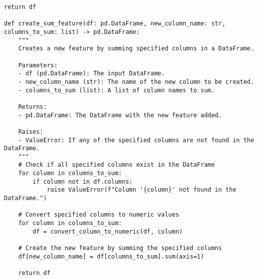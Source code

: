 \begin{tcolorbox}[title=Tools for DA-Bench, width=\textwidth,top=0mm,  breakable]
\begin{Verbatim}[breaklines=true, breakanywhere=true, fontsize=\footnotesize]
    return df

def create_sum_feature(df: pd.DataFrame, new_column_name: str, columns_to_sum: list) -> pd.DataFrame:
    """
    Creates a new feature by summing specified columns in a DataFrame.
    
    Parameters:
    - df (pd.DataFrame): The input DataFrame.
    - new_column_name (str): The name of the new column to be created.
    - columns_to_sum (list): A list of column names to sum.
    
    Returns:
    - pd.DataFrame: The DataFrame with the new feature added.
    
    Raises:
    - ValueError: If any of the specified columns are not found in the DataFrame.
    """
    # Check if all specified columns exist in the DataFrame
    for column in columns_to_sum:
        if column not in df.columns:
            raise ValueError(f"Column '{column}' not found in the DataFrame.")
    
    # Convert specified columns to numeric values
    for column in columns_to_sum:
        df = convert_column_to_numeric(df, column)
    
    # Create the new feature by summing the specified columns
    df[new_column_name] = df[columns_to_sum].sum(axis=1)
    
    return df
\end{Verbatim}
\end{tcolorbox}


